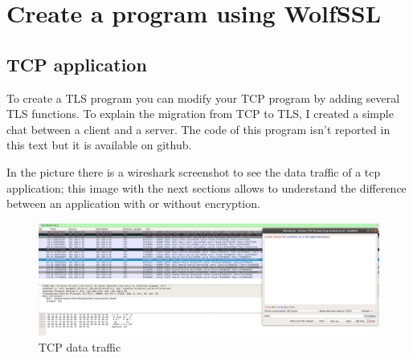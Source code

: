 \documentclass[a4paper,12pt]{article}
\begin{document}
\section{Create a program using WolfSSL}
\subsection{TCP application}
To create a TLS program you can modify your TCP program by adding several TLS functions. To explain the migration from TCP to TLS, I created a simple chat between a client and a server. The code of this program isn't reported in this text but it is available on github.

In the picture there is a wireshark screenshot to see the data traffic of a tcp application; this image with the next sections allows to understand the difference between an application with or without encryption.

\begin{figure}[H]
    \centering
    \includegraphics[scale=0.23]{./code/tcp/img/test.png}
    \caption{TCP data traffic}
    
\end{figure}
\end{document}
